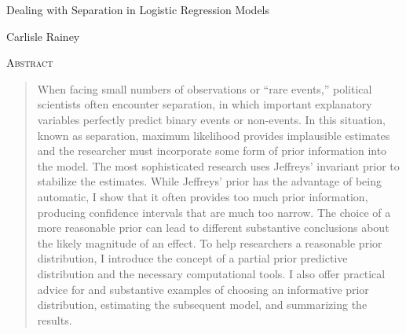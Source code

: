 \documentclass[12pt]{article}
\begin{document}
\begin{center}
{\LARGE Dealing with Separation in Logistic Regression Models}

\vspace{10mm}

Carlisle Rainey

\end{center}

\thispagestyle{empty}

\vspace{10mm}
{\centerline{\textsc{Abstract}}}
\begin{quote}\noindent When facing small numbers of observations or ``rare events,'' political scientists often encounter separation, in which important explanatory variables perfectly predict binary events or non-events. In this situation, known as separation, maximum likelihood provides implausible estimates and the researcher must incorporate some form of prior information into the model. The most sophisticated research uses Jeffreys' invariant prior to stabilize the estimates. While Jeffreys' prior has the advantage of being automatic, I show that it often provides too much prior information, producing confidence intervals that are much too narrow. The choice of a more reasonable prior can lead to different substantive conclusions about the likely magnitude of an effect. To help researchers a reasonable prior distribution, I introduce the concept of a partial prior predictive distribution and the necessary computational tools. I also offer practical advice for and substantive examples of choosing an informative prior distribution, estimating the subsequent model, and summarizing the results.\end{quote}


\newpage
\doublespace
\end{document}
